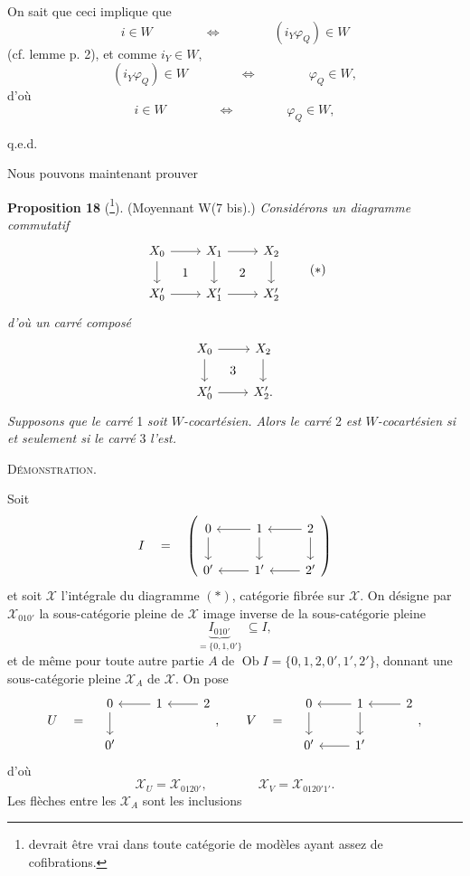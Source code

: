 \documentclass[11pt]{article}
\newcommand{\printedpage}[1]{\marginpar{\footnotesize p.~#1}}
\newcommand{\msp}[1]{\marginpar{\footnotesize [#1]}}
\newcommand{\cX}{\mathscr{X}}
\newcommand{\Ob}{\operatorname{Ob}}
\begin{document}
On sait que ceci implique que
\[
i \in W \qquad\qquad \Longleftrightarrow \qquad\qquad (i_Y\varphi_Q) \in W
\]
(cf. lemme p. 2), et comme $i_Y \in W$,
\[
(i_Y\varphi_Q) \in W \qquad\qquad \Longleftrightarrow \qquad\qquad \varphi_Q \in W,
\]
d'où
\[
i \in W \qquad\qquad \Longleftrightarrow \qquad\qquad \varphi_Q \in W,
\]

\hfill q.e.d.

Nous pouvons maintenant prouver

\msp{page 236}

\textbf{Proposition 18} (\footnote[127]{devrait être vrai dans toute catégorie de modèles ayant assez de cofibrations.}). (Moyennant W(7 bis).) \textit{Considérons un diagramme commutatif}
\[
\begin{tikzcd}[ampersand replacement=\&]
X_0 \arrow[r] \arrow[d] \arrow[rd, phantom, "1"] \& X_1 \arrow[r] \arrow[d] \arrow[rd, phantom, "2"] \& X_2 \arrow[d] \\
X'_0 \arrow[r] \& X'_1 \arrow[r] \& X'_2
\end{tikzcd}
\tag*{$(\ast)$}
\]
\textit{d'où un carré composé}
\[
\begin{tikzcd}[ampersand replacement=\&]
X_0 \arrow[r] \arrow[d] \arrow[rd, phantom, "3"] \& X_2 \arrow[d] \\
X'_0 \arrow[r] \& X'_2.
\end{tikzcd}
\]
\textit{Supposons que le carré} 1 \textit{soit $W$-cocartésien. Alors le carré} 2 \textit{est $W$-cocartésien si et seulement si le carré} 3 \textit{l'est.}

\textsc{Démonstration.}



\printedpage{152}

Soit
\[
I \quad = \quad
\left(
\begin{tikzcd}[ampersand replacement=\&]
0 \arrow[d] \& 1 \arrow[l] \arrow[d] \& 2 \arrow[l] \arrow[d] \\
0' \& 1' \arrow[l] \& 2' \arrow[l]
\end{tikzcd}
\right)
\]
et soit $\cX$ l'intégrale du diagramme $(\ast)$, catégorie fibrée sur $\cX$. On désigne par $\cX_{010'}$ la sous-catégorie pleine de $\cX$ image inverse de la sous-catégorie pleine %
\[
\underbrace{I_{010'}}_{=\{0,1,0'\}} \ \subseteq I,
\]
et de même pour toute autre partie $A$ de $\Ob I = \{0,1,2,0',1',2'\}$, donnant une sous-catégorie pleine $\cX_A$ de $\cX$. On pose
\[
U \quad = \quad
\begin{tikzcd}[ampersand replacement=\&]
0 \arrow[d] \& 1 \arrow[l] \& 2 \arrow[l] \\
0' \& \&
\end{tikzcd}
, \qquad
V \quad = \quad
\begin{tikzcd}[ampersand replacement=\&]
0 \arrow[d] \& 1 \arrow[l] \arrow[d] \& 2 \arrow[l] \\
0' \& 1' \arrow[l] \&
\end{tikzcd}
,
\]
d'où
\[
\cX_U = \cX_{0120'}, \qquad\qquad \cX_V = \cX_{0120'1'}.
\]
Les flèches entre les $\cX_A$ sont les inclusions
\end{document}
